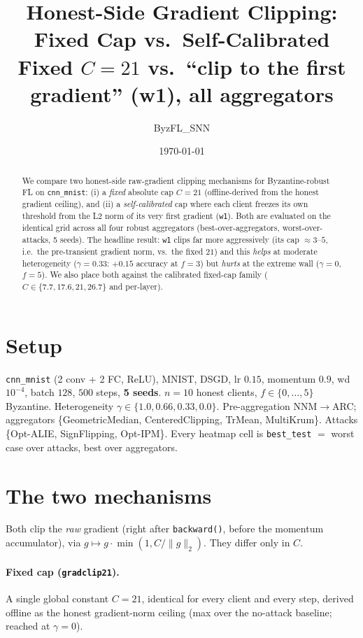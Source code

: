 \documentclass[11pt]{article}
\title{\textbf{Honest-Side Gradient Clipping: Fixed Cap vs.\ Self-Calibrated}\\[2pt]
\large Fixed $C{=}21$ vs.\ ``clip to the first gradient'' (w1), all aggregators}
\author{ByzFL\_SNN}
\date{\today}
\newcommand{\code}[1]{\texttt{#1}}
\begin{document}
\maketitle

\begin{abstract}
We compare two honest-side raw-gradient clipping mechanisms for Byzantine-robust FL on
\code{cnn\_mnist}: (i) a \emph{fixed} absolute cap $C=21$ (offline-derived from the honest
gradient ceiling), and (ii) a \emph{self-calibrated} cap where each client freezes its own
threshold from the L2 norm of its very first gradient (\code{w1}). Both are evaluated on the
identical grid across all four robust aggregators (best-over-aggregators, worst-over-attacks,
5 seeds). The headline result: \code{w1} clips far more aggressively (its cap
$\approx 3$--$5$, i.e.\ the pre-transient gradient norm, vs.\ the fixed $21$) and this
\emph{helps} at moderate heterogeneity ($\gamma{=}0.33$: $+0.15$ accuracy at $f{=}3$) but
\emph{hurts} at the extreme wall ($\gamma{=}0$, $f{=}5$). We also place both against the
calibrated fixed-cap family ($C\in\{7.7,17.6,21,26.7\}$ and per-layer).
\end{abstract}

\section{Setup}
\code{cnn\_mnist} (2 conv + 2 FC, ReLU), MNIST, DSGD, lr $0.15$, momentum $0.9$, wd $10^{-4}$,
batch $128$, $500$ steps, \textbf{5 seeds}. $n{=}10$ honest clients, $f\in\{0,\dots,5\}$
Byzantine. Heterogeneity $\gamma\in\{1.0,0.66,0.33,0.0\}$. Pre-aggregation NNM$\to$ARC;
aggregators \{GeometricMedian, CenteredClipping, TrMean, MultiKrum\}. Attacks \{Opt-ALIE,
SignFlipping, Opt-IPM\}. Every heatmap cell is \code{best\_test} $=$ worst case over attacks,
best over aggregators.

\section{The two mechanisms}
Both clip the \emph{raw} gradient (right after \code{backward()}, before the momentum
accumulator), via $g \mapsto g\cdot\min(1, C/\lVert g\rVert_2)$. They differ only in $C$.

\paragraph{Fixed cap (\code{gradclip21}).}
A single global constant $C=21$, identical for every client and every step, derived offline
as the honest gradient-norm ceiling (max over the no-attack baseline; reached at $\gamma{=}0$).
\end{document}
